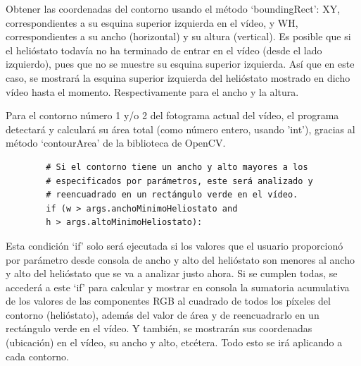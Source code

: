 Obtener las coordenadas del contorno usando el método ‘boundingRect’: XY, correspondientes a su esquina superior izquierda en el vídeo, y WH, correspondientes a su ancho (horizontal) y su altura (vertical). Es posible que si el helióstato todavía no ha terminado de entrar en el vídeo (desde el lado izquierdo), pues que no se muestre su esquina superior izquierda. Así que en este caso, se mostrará la esquina superior izquierda del helióstato mostrado en dicho vídeo hasta el momento. Respectivamente para el ancho y la altura.

Para el contorno número 1 y/o 2 del fotograma actual del vídeo, el programa detectará y calculará su área total (como número entero, usando 'int'), gracias al método ‘contourArea’ de la biblioteca de OpenCV.\\[20pt]

\begin{lstlisting}
        # Si el contorno tiene un ancho y alto mayores a los
        # especificados por parámetros, este será analizado y
        # reencuadrado en un rectángulo verde en el vídeo.
        if (w > args.anchoMinimoHeliostato and
        h > args.altoMinimoHeliostato):
\end{lstlisting}

Esta condición ‘if’ solo será ejecutada si los valores que el usuario proporcionó por parámetro desde consola de ancho y alto del helióstato son menores al ancho y alto del helióstato que se va a analizar justo ahora. Si se cumplen todas, se accederá a este ‘if’ para calcular y mostrar en consola la sumatoria acumulativa de los valores de las componentes RGB al cuadrado de todos los píxeles del contorno (helióstato), además del valor de área y de reencuadrarlo en un rectángulo verde en el vídeo. Y también, se mostrarán sus coordenadas (ubicación) en el vídeo, su ancho y alto, etcétera. Todo esto se irá aplicando a cada contorno.\\[20pt]            

